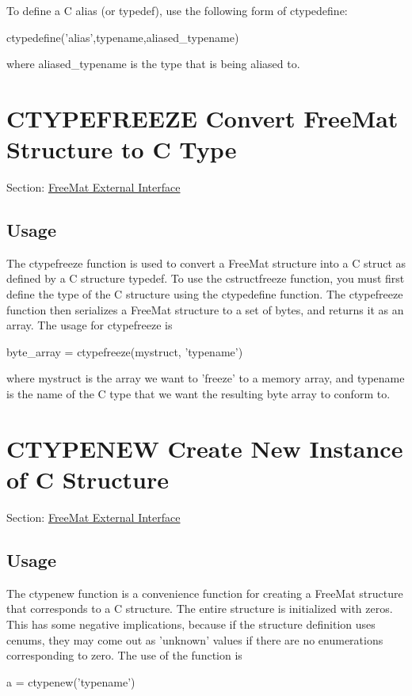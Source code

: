 To define a C alias (or typedef), use the following form of {\ttfamily ctypedefine}\-: \begin{DoxyVerb}  ctypedefine('alias',typename,aliased_typename)
\end{DoxyVerb}
 where {\ttfamily aliased\-\_\-typename} is the type that is being aliased to. \hypertarget{external_ctypefreeze}{}\section{C\-T\-Y\-P\-E\-F\-R\-E\-E\-Z\-E Convert Free\-Mat Structure to C Type}\label{external_ctypefreeze}
Section\-: \hyperlink{sec_external}{Free\-Mat External Interface} \hypertarget{vtkwidgets_vtkxyplotwidget_Usage}{}\subsection{Usage}\label{vtkwidgets_vtkxyplotwidget_Usage}
The {\ttfamily ctypefreeze} function is used to convert a Free\-Mat structure into a C struct as defined by a C structure typedef. To use the {\ttfamily cstructfreeze} function, you must first define the type of the C structure using the {\ttfamily ctypedefine} function. The {\ttfamily ctypefreeze} function then serializes a Free\-Mat structure to a set of bytes, and returns it as an array. The usage for {\ttfamily ctypefreeze} is \begin{DoxyVerb}  byte_array = ctypefreeze(mystruct, 'typename')
\end{DoxyVerb}
 where {\ttfamily mystruct} is the array we want to 'freeze' to a memory array, and {\ttfamily typename} is the name of the C type that we want the resulting byte array to conform to. \hypertarget{external_ctypenew}{}\section{C\-T\-Y\-P\-E\-N\-E\-W Create New Instance of C Structure}\label{external_ctypenew}
Section\-: \hyperlink{sec_external}{Free\-Mat External Interface} \hypertarget{vtkwidgets_vtkxyplotwidget_Usage}{}\subsection{Usage}\label{vtkwidgets_vtkxyplotwidget_Usage}
The {\ttfamily ctypenew} function is a convenience function for creating a Free\-Mat structure that corresponds to a C structure. The entire structure is initialized with zeros. This has some negative implications, because if the structure definition uses {\ttfamily cenums}, they may come out as {\ttfamily 'unknown'} values if there are no enumerations corresponding to zero. The use of the function is \begin{DoxyVerb}   a = ctypenew('typename')
\end{DoxyVerb}

